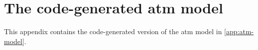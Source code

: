 
\chapter{The code-generated \ac{atm} model}
\label{app:atm-code}

This appendix contains the code-generated version of the \ac{atm}
model in \cref{app:atm-model}.











